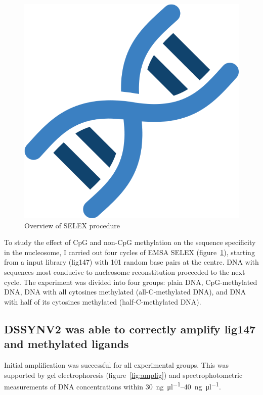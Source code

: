 \documentclass[parskip=full, numbers=noenddot]{scrreprt}
\begin{document}
\begin{figure}[htpb]
  \centering
  \includegraphics[width=\textwidth]{test}
  \caption{Overview of SELEX procedure}
  \label{fig:selex}
\end{figure}

To study the effect of CpG and non-CpG methylation on the sequence specificity in the nucleosome, I carried out four cycles of EMSA SELEX (figure~\ref{fig:selex}), starting from a input library (lig147) with 101 random base pairs at the centre. DNA with sequences most conducive to nucleosome reconstitution proceeded to the next cycle. The experiment was divided into four groups: plain DNA, CpG-methylated DNA, DNA with all cytosines methylated (all-C-methylated DNA), and DNA with half of its cytosines methylated (half-C-methylated DNA).

\subsection{DSSYNV2 was able to correctly amplify lig147 and methylated ligands}
\label{ssec:amplig}


Initial amplification was successful for all experimental groups. This was supported by gel electrophoresis (figure~\ref{fig:amplig}) and spectrophotometric measurements of DNA concentrations within \SIrange{30}{40}{\nano\gram\per\micro\litre}.
\end{document}
